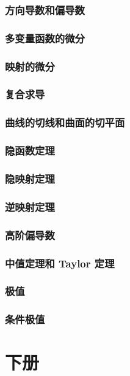 \documentclass[a4paper, 11pt]{ctexbook}
\begin{document}
            \section{方向导数和偏导数}
                
            \section{多变量函数的微分}
                
            \section{映射的微分}
                
            \section{复合求导}
            \section{曲线的切线和曲面的切平面}
            \section{隐函数定理}
            \section{隐映射定理}
            \section{逆映射定理}
            \section{高阶偏导数}
            \section{中值定理和 Taylor 定理}
            \section{极值}
            \section{条件极值}
    \part{下册}
\end{document}

